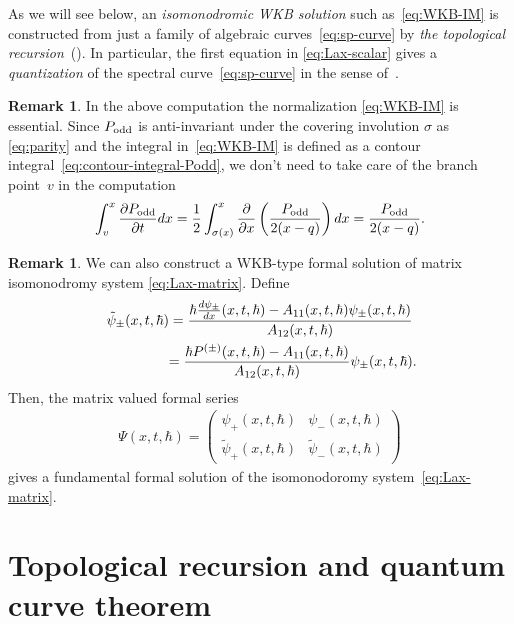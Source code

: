 \documentclass[pdftex]{sigma}
\theoremstyle{definition}
\newtheorem{rem}[thm]{Remark}
\numberwithin{equation}{section}
\def\p{\partial}
\begin{document}
As we will see below, an {\em isomonodromic WKB solution}
such as~\eqref{eq:WKB-IM}
is constructed from just a family of algebraic curves~\eqref{eq:sp-curve}
by {\em the topological recursion}~(\cite{EO07}).
In particular, the f\/irst equation
in \eqref{eq:Lax-scalar} gives a {\em quantization}
of the spectral curve~\eqref{eq:sp-curve}
in the sense of~\cite{DM14, DM14-2}.

\begin{rem}
In the above computation the normalization \eqref{eq:WKB-IM}
is essential. Since $P_{\rm odd}$ is anti-invariant under the
covering involution $\sigma$ as \eqref{eq:parity} and
the integral in~\eqref{eq:WKB-IM} is
def\/ined as a contour integral~\eqref{eq:contour-integral-Podd},
we don't need to take care of the branch point~$v$ in the computation
\begin{gather*}
\int^{x}_{v} \frac{\partial P_{\rm odd}}{\partial t}dx =
\frac{1}{2}\int^{x}_{\sigma(x)}
\frac{\p}{\p x}\left( \frac{P_{\rm odd}}{2(x-q)}\right)dx
= \frac{P_{\rm odd}}{2(x-q)}.
\end{gather*}
\end{rem}

\begin{rem}
We can also construct a WKB-type formal solution
of matrix isomonodromy system \eqref{eq:Lax-matrix}.
Def\/ine
\begin{gather*}
\tilde{\psi}_{\pm}(x,t,\hbar)   =
\frac{ \hbar \frac{d \psi_{\pm}}{dx}(x,t,\hbar) - A_{11}(x,t,\hbar)
\psi_{\pm}(x,t,\hbar)}{A_{12}(x,t,\hbar)}  \\
\hphantom{\tilde{\psi}_{\pm}(x,t,\hbar) }{}
  =
\frac{\hbar P^{(\pm)}(x,t,\hbar) - A_{11}(x,t,\hbar)}
{A_{12}(x,t,\hbar)} \psi_{\pm}(x,t,\hbar).
\end{gather*}
Then, the matrix valued formal series
\begin{gather} \label{eq:WKB-IM-mat}
\Psi(x,t,\hbar)   =
\begin{pmatrix}
\psi_{+}(x,t,\hbar) & \psi_{-}(x,t,\hbar) \\[+.7em]
\tilde{\psi}_{+}(x,t,\hbar) & \tilde{\psi}_{-}(x,t,\hbar)
\end{pmatrix}
\end{gather}
gives a fundamental formal solution of the
isomonodoromy system~\eqref{eq:Lax-matrix}.
\end{rem}

\section{Topological recursion and quantum curve theorem}\label{section3}
\end{document}
